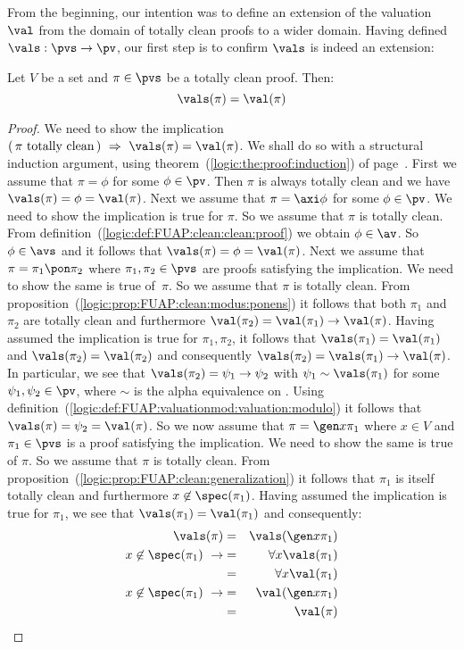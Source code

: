 From the beginning, our intention was to define an extension of the
valuation $\val$ from the domain of totally clean proofs to a wider
domain. Having defined $\vals:\pvs\to\pv$, our first step is to
confirm $\vals$ is indeed an extension:
\begin{prop}\label{logic:prop:FUAP:valuationmod:clean:proof}
Let $V$ be a set and $\pi\in\pvs$ be a totally clean proof. Then:
    \[
    \vals(\pi)=\val(\pi)
    \]
\end{prop}
\begin{proof}
We need to show the implication $(\,\mbox{$\pi$ totally clean}\,)\
\Rightarrow\ \vals(\pi)=\val(\pi)$. We shall do so with a structural
induction argument, using theorem~(\ref{logic:the:proof:induction})
of page~\pageref{logic:the:proof:induction}. First we assume that
$\pi=\phi$ for some $\phi\in\pv$. Then $\pi$ is always totally clean
and we have $\vals(\pi)=\phi=\val(\pi)$. Next we assume that
$\pi=\axi\phi$ for some $\phi\in\pv$. We need to show the
implication is true for $\pi$. So we assume that $\pi$ is totally
clean. From definition~(\ref{logic:def:FUAP:clean:clean:proof}) we
obtain $\phi\in\av$. So $\phi\in\avs$ and it follows that
$\vals(\pi)=\phi=\val(\pi)$. Next we assume that
$\pi=\pi_{1}\pon\pi_{2}$ where $\pi_{1},\pi_{2}\in\pvs$ are proofs
satisfying the implication. We need to show the same is true
of~$\pi$. So we assume that $\pi$ is totally clean. From
proposition~(\ref{logic:prop:FUAP:clean:modus:ponens}) it follows
that both $\pi_{1}$ and $\pi_{2}$ are totally clean and furthermore
$\val(\pi_{2})=\val(\pi_{1})\to\val(\pi)$. Having assumed the
implication is true for $\pi_{1},\pi_{2}$, it follows that
$\vals(\pi_{1})=\val(\pi_{1})$ and $\vals(\pi_{2})=\val(\pi_{2})$
and consequently $\vals(\pi_{2})=\vals(\pi_{1})\to\val(\pi)$. In
particular, we see that $\vals(\pi_{2})=\psi_{1}\to\psi_{2}$ with
$\psi_{1}\sim\vals(\pi_{1})$ for some $\psi_{1},\psi_{2}\in\pv$,
where $\sim$ is the alpha equivalence on \pv. Using
definition~(\ref{logic:def:FUAP:valuationmod:valuation:modulo}) it
follows that $\vals(\pi)=\psi_{2}=\val(\pi)$. So we now assume that
$\pi=\gen x\pi_{1}$ where $x\in V$ and $\pi_{1}\in\pvs$ is a proof
satisfying the implication. We need to show the same is true of
$\pi$. So we assume that $\pi$ is totally clean. From
proposition~(\ref{logic:prop:FUAP:clean:generalization}) it follows
that $\pi_{1}$ is itself totally clean and furthermore
$x\not\in\spec(\pi_{1})$. Having assumed the implication is true for
$\pi_{1}$, we see that $\vals(\pi_{1})=\val(\pi_{1})$ and
consequently:
    \begin{eqnarray*}
    \vals(\pi)&=&\vals(\gen x\pi_{1})\\
    x\not\in\spec(\pi_{1})\ \rightarrow
    &=&\forall x\vals(\pi_{1})\\
    &=&\forall x\val(\pi_{1})\\
    x\not\in\spec(\pi_{1})\ \rightarrow
    &=&\val(\gen x\pi_{1})\\
    &=&\val(\pi)
    \end{eqnarray*}
\end{proof}

